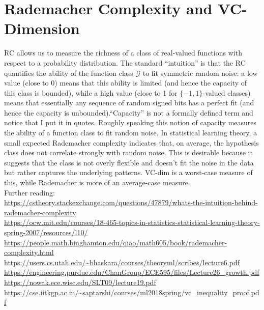\chapter{Rademacher Complexity and VC-Dimension}
\begin{flushleft}
	RC allows us to measure the richness of a class of real-valued
	functions with respect to a probability distribution. The standard
	``intuition'' is that the RC quantifies the ability of the
	function class $\mathcal{G}$ to fit symmetric random noise: a low value
	(close to 0) means
	that this ability is limited (and hence the capacity of this class is
	bounded), while a high value (close to 1 for $\{-1,1\}$-valued
	classes) means that essentially any sequence of random signed
	bits has a perfect fit (and hence the capacity is unbounded).``Capacity''
	is not a formally defined term and notice that I put it in quotes.
	Roughly
	speaking this notion of capacity measures the ability of a function
	class to fit random noise. In statistical learning theory, a small expected Rademacher complexity indicates that, on average,
	the hypothesis class does not correlate strongly with random noise. This is desirable because
	it suggests that the class is not overly flexible and doesn't fit the noise in the data but rather captures the underlying patterns.
	VC-dim is a worst-case measure of this, while Rademacher is more of an
	average-case measure.\\
	Further reading:\\

	\url{https://cstheory.stackexchange.com/questions/47879/whats-the-intuition-behind-rademacher-complexity}\\
	\url{https://ocw.mit.edu/courses/18-465-topics-in-statistics-statistical-learning-theory-spring-2007/resources/l10/}\\
	\url{https://people.math.binghamton.edu/qiao/math605/book/rademacher-complexity.html}\\

	\url{https://users.cs.utah.edu/~bhaskara/courses/theoryml/scribes/lecture6.pdf}\\

	\url{https://engineering.purdue.edu/ChanGroup/ECE595/files/Lecture26_growth.pdf}\\
	\url{https://nowak.ece.wisc.edu/SLT09/lecture19.pdf}\\

	\url{https://cse.iitkgp.ac.in/~saptarshi/courses/ml2018spring/vc_inequality_proof.pdf}\\


\end{flushleft}
